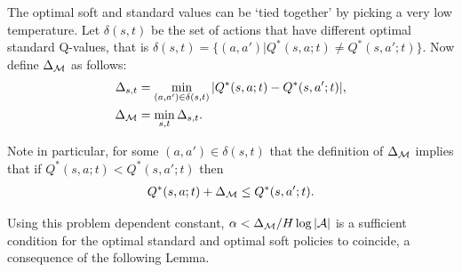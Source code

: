         The optimal soft and standard values can be `tied together' by picking a very low temperature. Let $\delta(s,t)$ be the set of actions that have different optimal standard Q-values, that is $\delta(s,t)=\{(a,a')|Q^*(s,a;t)\neq Q^*(s,a';t)\}$. Now define $\Delta_{\mathcal{M}}$ as follows:
        \begin{align}
            \Delta_{s,t} &= \min_{(a,a')\in\delta(s,t)} |Q^*(s,a;t)-Q^*(s,a';t)|, \\
            \Delta_{\mathcal{M}} &= \min_{s,t} \Delta_{s,t}. \label{eq:delta}
        \end{align}
    
        Note in particular, for some $(a,a')\in\delta(s,t)$ that the definition of $\Delta_{\mathcal{M}}$ implies that if $Q^*(s,a;t)<Q^*(s,a';t)$ then 
        \begin{align}
            Q^*(s,a;t)+\Delta_{\mathcal{M}}\leq Q^*(s,a';t). \label{appeq:delta_diff}
        \end{align}
    
    
    
    
    
    
        
        Using this problem dependent constant, $\alpha < \Delta_{\mathcal{M}} / H\log |\mathcal{A}|$ is a sufficient condition for the optimal standard and optimal soft policies to coincide, a consequence of the following Lemma.
    

